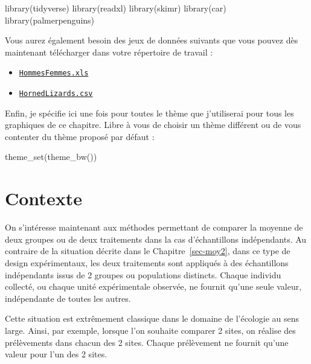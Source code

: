 \documentclass[
  a4paper,
  DIV=11,
  numbers=noendperiod,
  oneside]{scrreprt}
\newenvironment{Shaded}{}{}
\newcommand{\FunctionTok}[1]{\textcolor[rgb]{0.44,0.26,0.76}{#1}}
\newcommand{\NormalTok}[1]{\textcolor[rgb]{0.14,0.16,0.18}{#1}}
\providecommand{\tightlist}{%
  \setlength{\itemsep}{0pt}\setlength{\parskip}{0pt}}\usepackage{longtable,booktabs,array}
\begin{document}
\begin{Shaded}
\begin{Highlighting}[]
\FunctionTok{library}\NormalTok{(tidyverse)}
\FunctionTok{library}\NormalTok{(readxl)}
\FunctionTok{library}\NormalTok{(skimr)}
\FunctionTok{library}\NormalTok{(car)}
\FunctionTok{library}\NormalTok{(palmerpenguins)}
\end{Highlighting}
\end{Shaded}

Vous aurez également besoin des jeux de données suivants que vous pouvez
dès maintenant télécharger dans votre répertoire de travail :

\begin{itemize}
\tightlist
\item
  \href{data/HommesFemmes.xls}{\texttt{HommesFemmes.xls}}
\item
  \href{data/HornedLizards.csv}{\texttt{HornedLizards.csv}}
\end{itemize}

Enfin, je spécifie ici une fois pour toutes le thème que j'utiliserai
pour tous les graphiques de ce chapitre. Libre à vous de choisir un
thème différent ou de vous contenter du thème proposé par défaut :

\begin{Shaded}
\begin{Highlighting}[]
\FunctionTok{theme\_set}\NormalTok{(}\FunctionTok{theme\_bw}\NormalTok{())}
\end{Highlighting}
\end{Shaded}

\hypertarget{contexte-2}{%
\section{Contexte}\label{contexte-2}}

On s'intéresse maintenant aux méthodes permettant de comparer la moyenne
de deux groupes ou de deux traitements dans la cas d'échantillons
indépendants. Au contraire de la situation décrite dans le
Chapitre~\ref{sec-moy2}, dans ce type de design expérimentaux, les deux
traitements sont appliqués à des échantillons indépendants issus de 2
groupes ou populations distincts. Chaque individu collecté, ou chaque
unité expérimentale observée, ne fournit qu'une seule valeur,
indépendante de toutes les autres.

Cette situation est extrêmement classique dans le domaine de l'écologie
au sens large. Ainsi, par exemple, lorsque l'on souhaite comparer 2
sites, on réalise des prélèvements dans chacun des 2 sites. Chaque
prélèvement ne fournit qu'une valeur pour l'un des 2 sites.
\end{document}
